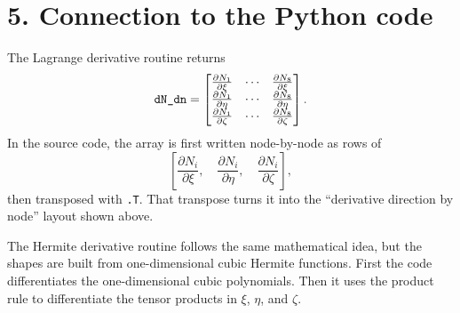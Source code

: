 \documentclass[11pt]{article}
\newcommand{\pd}[2]{\frac{\partial #1}{\partial #2}}
\begin{document}
\section*{5. Connection to the Python code}

The Lagrange derivative routine returns
\[
\text{\texttt{dN\_dn}}
=
\begin{bmatrix}
\pd{N_1}{\xi} & \cdots & \pd{N_8}{\xi}\\
\pd{N_1}{\eta} & \cdots & \pd{N_8}{\eta}\\
\pd{N_1}{\zeta} & \cdots & \pd{N_8}{\zeta}
\end{bmatrix}.
\]
In the source code, the array is first written node-by-node as rows of
\[
\left[
\pd{N_i}{\xi},\quad
\pd{N_i}{\eta},\quad
\pd{N_i}{\zeta}
\right],
\]
then transposed with \texttt{.T}. That transpose turns it into the
``derivative direction by node'' layout shown above.

The Hermite derivative routine follows the same mathematical idea, but the
shapes are built from one-dimensional cubic Hermite functions. First the code
differentiates the one-dimensional cubic polynomials. Then it uses the product
rule to differentiate the tensor products in $\xi$, $\eta$, and $\zeta$.
\end{document}
